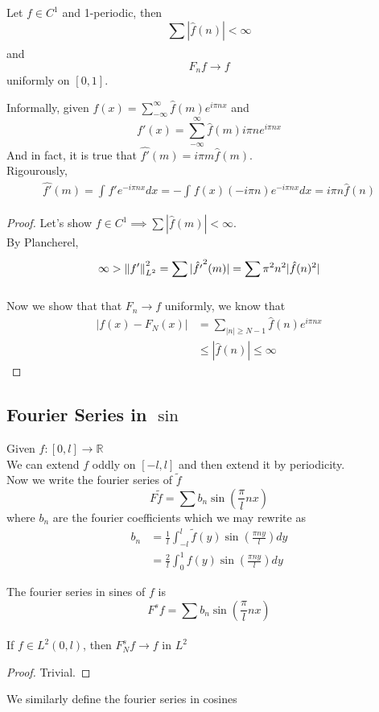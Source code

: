 \documentclass[../main.tex]{subfiles}
\begin{document}
\begin{thm}
	Let $f\in C^{1}$ and 1-periodic, then
	\[ 
	\sum_{}^{ } | \hat{f}( n) | < \infty 
	\]
	and
	\[ 
	F_n f \to f 
	\]
	uniformly on $[0,1]$.
\end{thm}
\begin{rmq}
Informally, given $f( x) = \sum_{- \infty }^{ \infty } \hat{f}( m) e^{i\pi n x} $ and
\[ 
f'( x) = \sum_{ - \infty }^{ \infty } \hat{f}( m) i \pi n e^{i\pi n x} 
\]
And in fact, it is true that $ \hat{f'}( m) = i \pi m \hat{f}( m) $.\\
Rigourously,
\begin{align*}
\hat{f'}( m) = \int_{  }^{  } f' e^{- i \pi n x } dx = - \int_{  }^{  } f( x) ( - i \pi n) e^{- i \pi n x } dx = i \pi n \hat{f}( n) 
\end{align*}
\end{rmq}
\begin{proof}
Let's show $f\in C^{1}\implies \sum | \hat{f}( m) | < \infty $.\\
By Plancherel,
\begin{align*}
\infty  > \left\lVert f'\right\rVert _{L^{2}}^{2} = \sum_{}^{ } | \hat{f'}^{2}( m) |= \sum_{}^{ } \pi^{2}n^{2} | \hat{f}( n) ^{2}|
\end{align*}

Now we show that that $F_n \to f$ uniformly, we know that
\begin{align*}
|f( x) - F_N( x) | &= \sum_{ |n| \geq N -1}^{ } \hat{f}( n)  e^{i\pi n x} \\
		   & \leq | \hat{f}( n) | \leq  \infty 
\end{align*}


\end{proof}
\subsection{Fourier Series in $\sin$ }
Given $f: [ 0, l] \to \mathbb{R}$ \\
We can extend $f$ oddly on $[-l,l]$ and then extend it by periodicity.\\
Now we write the fourier series of $\tilde f$ 
\[ 
F \tilde f = \sum b_n \sin(  \frac{\pi}{l} n x ) 
\]
where $b_n$ are the fourier coefficients which we may rewrite as
\begin{align*}
b_n &= \frac{1}{l}  \int_{ -l }^{ l } \tilde f ( y)  \sin ( \frac{\pi ny}{l}) dy \\
    &= \frac{2}{l} \int_{ 0 }^{ 1 } f( y) \sin(  \frac{\pi n y}{l}) dy
\end{align*}
\begin{defn}
The fourier series in sines of $f$ is 
\[ 
F^{s}f = \sum_{}^{ }b_n \sin ( \frac{\pi}{l} nx) 
\]

\end{defn}
\begin{crly}
If $f\in L^{2}( 0,l) $, then $F_N^{s}f \to f$ in $L^{2}$ 
\end{crly}
\begin{proof}
Trivial.
\end{proof}
We similarly define the fourier series in cosines 

			
\end{document}
